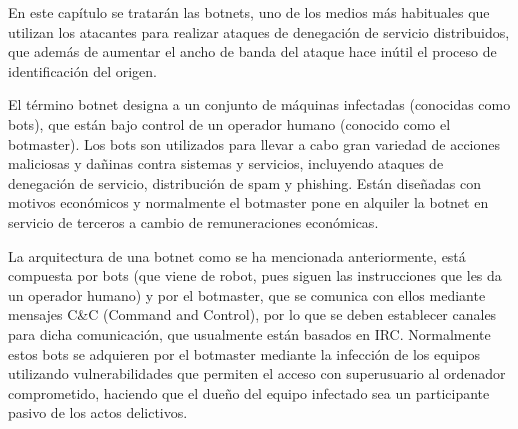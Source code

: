 En este capítulo se tratarán las botnets, uno de los medios más habituales que utilizan los atacantes para realizar ataques de denegación de servicio distribuidos, que además de aumentar el ancho de banda del ataque hace inútil el proceso de identificación del origen.

El término botnet designa a un conjunto de máquinas infectadas (conocidas como bots), que están bajo control de un operador humano (conocido como el botmaster). Los bots son utilizados para llevar a cabo gran variedad de acciones maliciosas y da\~ninas contra sistemas y servicios, incluyendo ataques de denegación de servicio, distribución de spam y phishing. Están dise\~nadas con motivos económicos y normalmente el botmaster pone en alquiler la botnet en servicio de terceros a cambio de remuneraciones económicas\cite{botnet-art}. 

La arquitectura de una botnet como se ha mencionada anteriormente, está compuesta por bots (que viene de robot, pues siguen las instrucciones que les da un operador humano) y por el botmaster, que se comunica con ellos mediante mensajes C\&C (Command and Control), por lo que se deben establecer canales para dicha comunicación, que usualmente están basados en IRC. Normalmente estos bots se adquieren por el botmaster mediante la infección de los equipos utilizando vulnerabilidades que permiten el acceso con superusuario al ordenador comprometido, haciendo que el due\~no del equipo infectado sea un participante pasivo de los actos delictivos\cite{botnet-art}.

